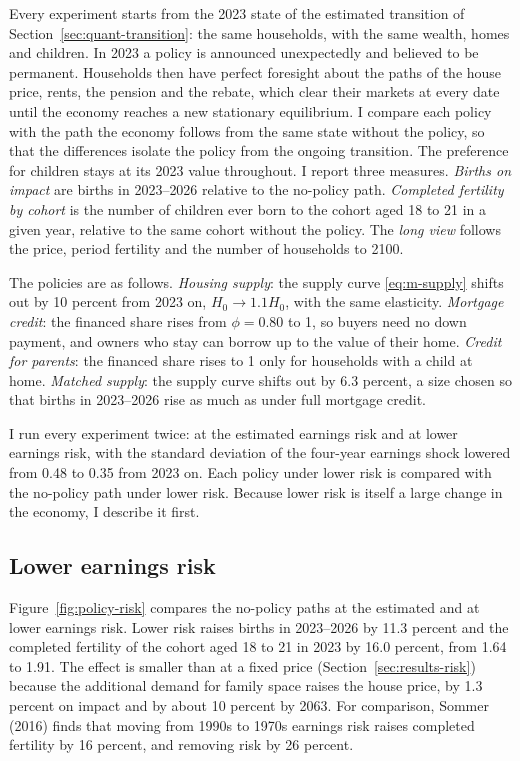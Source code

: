 Every experiment starts from the 2023 state of the estimated transition of
Section~\ref{sec:quant-transition}: the same households, with the same
wealth, homes and children. In 2023 a policy is announced unexpectedly and
believed to be permanent. Households then have perfect foresight about the
paths of the house price, rents, the pension and the rebate, which clear their
markets at every date until the economy reaches a new stationary equilibrium.
I compare each policy with the path the economy follows from the same state
without the policy, so that the differences isolate the policy from the
ongoing transition. The preference for children stays at its 2023 value
throughout. I report three measures. \emph{Births on impact} are births in
2023--2026 relative to the no-policy path. \emph{Completed fertility by
cohort} is the number of children ever born to the cohort aged 18 to 21 in a
given year, relative to the same cohort without the policy. The \emph{long
view} follows the price, period fertility and the number of households to
2100.

The policies are as follows. \emph{Housing supply}: the supply curve
\eqref{eq:m-supply} shifts out by 10 percent from 2023 on, $H_0\to1.1H_0$,
with the same elasticity. \emph{Mortgage credit}: the financed share rises
from $\phi=0.80$ to 1, so buyers need no down payment, and owners who stay can
borrow up to the value of their home. \emph{Credit for parents}: the financed
share rises to 1 only for households with a child at home. \emph{Matched
supply}: the supply curve shifts out by 6.3 percent, a size chosen so that
births in 2023--2026 rise as much as under full mortgage credit.

I run every experiment twice: at the estimated earnings risk and at lower
earnings risk, with the standard deviation of the four-year earnings shock
lowered from 0.48 to 0.35 from 2023 on. Each policy under lower risk is
compared with the no-policy path under lower risk. Because lower risk is
itself a large change in the economy, I describe it first.

\subsection{Lower earnings risk}
\label{sec:policy-risk}

Figure~\ref{fig:policy-risk} compares the no-policy paths at the estimated and
at lower earnings risk. Lower risk raises births in 2023--2026 by 11.3 percent
and the completed fertility of the cohort aged 18 to 21 in 2023 by 16.0
percent, from 1.64 to 1.91. The effect is smaller than at a fixed price
(Section~\ref{sec:results-risk}) because the additional demand for family
space raises the house price, by 1.3 percent on impact and by about 10 percent
by 2063. For comparison, Sommer (2016) finds that moving from 1990s to 1970s
earnings risk raises completed fertility by 16 percent, and removing risk by
26 percent.

